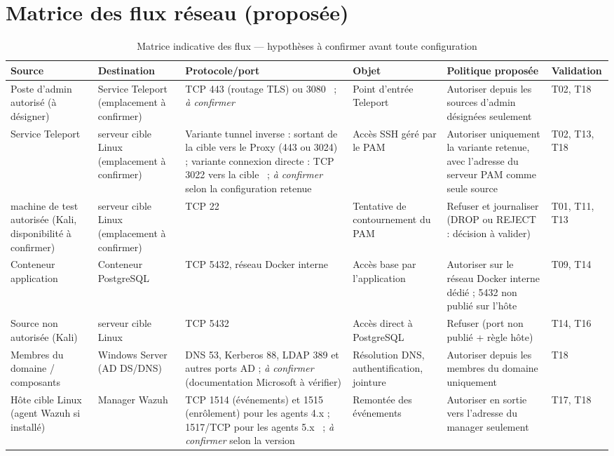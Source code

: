 \documentclass[11pt,a4paper]{report}
\newcommand{\aconf}{\emph{à confirmer}}
\begin{document}
\section{Matrice des flux réseau (proposée)}\label{sec:flux}
{\setlength{\tabcolsep}{3pt}\scriptsize
\begin{longtable}{@{}p{}p{}p{}p{}p{}p{}@{}}
\caption{Matrice indicative des flux --- hypothèses à confirmer avant toute configuration}\\
\toprule\textbf{Source} & \textbf{Destination} & \textbf{Protocole/port} & \textbf{Objet} & \textbf{Politique proposée} & \textbf{Validation}\\ \midrule\endhead
Poste d'admin autorisé (à désigner) & Service Teleport (emplacement à confirmer) & TCP 443 (routage TLS) ou 3080~\cite{tp-net} ; \aconf{} & Point d'entrée Teleport & Autoriser depuis les sources d'admin désignées seulement & T02, T18\\
Service Teleport & serveur cible Linux (emplacement à confirmer) & Variante tunnel inverse : sortant de la cible vers le Proxy (443 ou 3024) ; variante connexion directe : TCP 3022 vers la cible~\cite{tp-net} ; \aconf{} selon la configuration retenue & Accès SSH géré par le PAM & Autoriser uniquement la variante retenue, avec l'adresse du serveur PAM comme seule source & T02, T13, T18\\
machine de test autorisée (Kali, disponibilité à confirmer) & serveur cible Linux (emplacement à confirmer) & TCP 22 & Tentative de contournement du PAM & Refuser et journaliser (DROP ou REJECT : décision à valider) & T01, T11, T13\\
Conteneur application & Conteneur PostgreSQL & TCP 5432, réseau Docker interne & Accès base par l'application & Autoriser sur le réseau Docker interne dédié ; 5432 non publié sur l'hôte & T09, T14\\
Source non autorisée (Kali) & serveur cible Linux & TCP 5432 & Accès direct à PostgreSQL & Refuser (port non publié + règle hôte) & T14, T16\\
Membres du domaine / composants & Windows Server (AD DS/DNS) & DNS 53, Kerberos 88, LDAP 389 et autres ports AD ; \aconf{} (documentation Microsoft à vérifier) & Résolution DNS, authentification, jointure & Autoriser depuis les membres du domaine uniquement & T18\\
Hôte cible Linux (agent Wazuh si installé) & Manager Wazuh & TCP 1514 (événements) et 1515 (enrôlement) pour les agents 4.x ; 1517/TCP pour les agents 5.x~\cite{wazuh-arch,wazuh-enrol} ; \aconf{} selon la version & Remontée des événements & Autoriser en sortie vers l'adresse du manager seulement & T17, T18\\

\end{longtable}}
\end{document}
